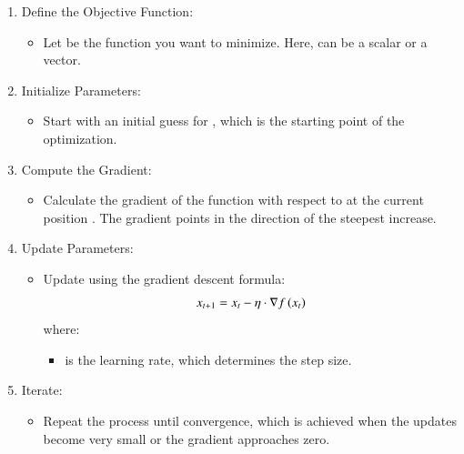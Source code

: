 \documentclass[journal]{IEEEtran}
\begin{document}
\begin{enumerate}
    \item Define the Objective Function:
    \begin{itemize}
        \item Let  be the function you want to minimize. Here,  can be a scalar or a vector.
    \end{itemize}

    \item Initialize Parameters:
    \begin{itemize}
        \item Start with an initial guess for , which is the starting point of the optimization.
    \end{itemize}

    \item Compute the Gradient:
    \begin{itemize}
        \item Calculate the gradient  of the function with respect to  at the current position . The gradient points in the direction of the steepest increase.
    \end{itemize}

    \item Update Parameters:
    \begin{itemize}
        \item Update  using the gradient descent formula:
        \begin{align}
            x_{t+1} = x_t - \eta \cdot \nabla f\left(x_t\right)
        \end{align}
        where:
        \begin{itemize}
            \item \brak{\eta} is the learning rate, which determines the step size.
        \end{itemize}
    \end{itemize}

    \item Iterate:
    \begin{itemize}
        \item Repeat the process until convergence, which is achieved when the updates become very small or the gradient approaches zero.
    \end{itemize}
\end{enumerate}
\end{document}
